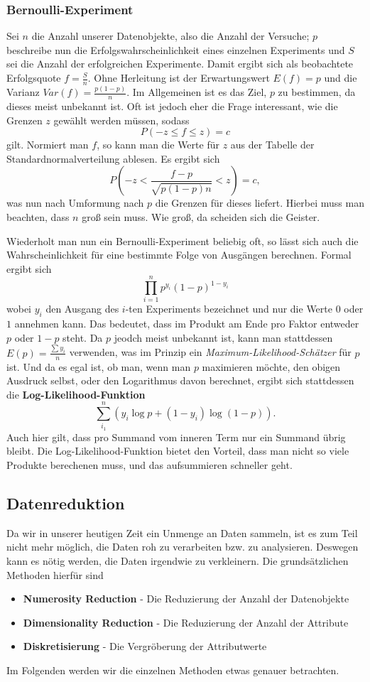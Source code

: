 \subsubsection{Bernoulli-Experiment}
Sei \(n\) die Anzahl unserer Datenobjekte,
also die Anzahl der Versuche; \(p\) beschreibe nun die Erfolgswahrscheinlichkeit
eines einzelnen Experiments und \(S\) sei die Anzahl der erfolgreichen Experimente.
Damit ergibt sich als beobachtete Erfolgsquote \(f=\frac{S}{n}\). Ohne
Herleitung ist der Erwartungswert \(E(f) = p\) und die Varianz \(Var(f)= \frac{p(1-p)}{n}\).
Im Allgemeinen ist es das Ziel, \(p\) zu bestimmen, da dieses meist unbekannt ist.
Oft ist jedoch eher die Frage interessant, wie die Grenzen \(z\) gewählt werden
müssen, sodass 
\[
	P(-z \leq f \leq z) = c
\]
gilt. Normiert man \(f\), so kann man die Werte für \(z\) aus der Tabelle
der Standardnormalverteilung ablesen. Es ergibt sich
\[
	P(-z < \frac{f-p}{\sqrt{p(1-p)n}} < z) = c ,
\]
was nun nach Umformung nach \(p\) die Grenzen für dieses liefert. Hierbei
muss man beachten, dass \(n\) groß sein muss. Wie groß, da scheiden sich
die Geister.

Wiederholt man nun ein Bernoulli-Experiment beliebig oft, so lässt sich auch
die Wahrscheinlichkeit für eine bestimmte Folge von Ausgängen berechnen. Formal
ergibt sich
\[
	\prod\limits_{i=1}^{n} p^{y_i} (1-p)^{1-y_i}
\]
wobei \(y_i\) den Ausgang des \(i\)-ten Experiments bezeichnet und nur die Werte
\(0\) oder \(1\) annehmen kann. Das bedeutet, dass im Produkt am Ende pro Faktor
entweder \(p\) oder \(1-p\) steht. Da \(p\) jeodch meist unbekannt ist, kann man
stattdessen \(E(p) = \frac{\sum y_i}{n}\) verwenden, was im Prinzip ein 
\textit{Maximum-Likelihood-Schätzer} für \(p\) ist. Und da es egal ist, ob man,
wenn man \(p\) maximieren möchte, den obigen Ausdruck selbst, oder den Logarithmus
davon berechnet, ergibt sich stattdessen die \textbf{Log-Likelihood-Funktion}
\[
    \sum\limits_{i_1}^n (y_i \log{p} + (1-y_i)\log(1-p)).
\]
Auch hier gilt, dass pro Summand vom inneren Term nur ein Summand übrig bleibt.
Die Log-Likelihood-Funktion bietet den Vorteil, dass man nicht so viele Produkte
berechenen muss, und das aufsummieren schneller geht.


\subsection{Datenreduktion}
Da wir in unserer heutigen Zeit ein Unmenge an Daten sammeln, ist es zum Teil nicht
mehr möglich, die Daten roh zu verarbeiten bzw. zu analysieren. Deswegen kann es
nötig werden, die Daten irgendwie zu verkleinern. Die grundsätzlichen Methoden
hierfür sind
\begin{itemize}
	\item \textbf{Numerosity Reduction} - Die Reduzierung der Anzahl der Datenobjekte
	\item \textbf{Dimensionality Reduction} - Die Reduzierung der Anzahl der Attribute
	\item \textbf{Diskretisierung} - Die Vergröberung der Attributwerte
\end{itemize}
Im Folgenden werden wir die einzelnen Methoden etwas genauer betrachten.

